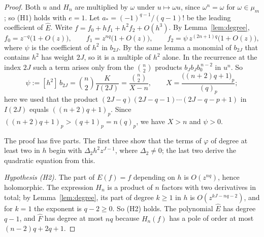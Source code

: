 \documentclass[11pt]{article}
\theoremstyle{definition}
\theoremstyle{remark}
\numberwithin{equation}{section}
\newcommand{\hatt}[1]{\widehat{#1}}
\begin{document}
\begin{proof}
Both \(u\) and \(H_n\) are multiplied by \(\omega\) under
\(u\mapsto\omega u\), since \(\omega^n=\omega\) for \(\omega\in\mu_m\);
so (H1) holds with \(e=1\). Let \(a_*=(-1)^{q-1}/(q-1)!\) be the
leading coefficient of \(\hatt E\). Write
\(f=f_0+hf_1+h^2f_2+O(h^3)\). By Lemma~\ref{lem:degree},
\[
 f_0=z^{-q}\bigl(1+O(z)\bigr),\qquad
 f_1=z^{nq}\bigl(1+O(z)\bigr),\qquad
 f_2=\psi\,z^{(2n+1)q}\bigl(1+O(z)\bigr),
\]
where \(\psi\) is the coefficient of \(h^2\) in \(b_{2J}\). By the
same lemma a monomial of \(b_{2J}\) that contains \(h^2\) has weight
\(2J\), so it is a multiple of \(h^2\) alone. In the recurrence at the
index \(2J\) such a term arises only from the \(\binom n2\) products
\(b_Jb_Jb_0^{\,n-2}\) in \(u^n\). So
\begin{equation}\label{eq:psi}
 \psi:=[h^2]\,b_{2J}=\binom n2\frac{K}{I(2J)}=\frac{\binom n2}{X-n},
 \qquad X=\frac{\bigl((n+2)q+1\bigr)_p}{(q)_p};
\end{equation}
here we used that the product \((2J-q)(2J-q-1)\cdots(2J-q-p+1)\) in
\(I(2J)\) equals \(((n+2)q+1)_p\). Since
\(((n+2)q+1)_p>(q+1)_p=n(q)_p\), we have \(X>n\) and \(\psi>0\).

The proof has five parts. The first three show that the terms of
\(\varphi\) of degree at least two in \(h\) begin with
\(\Delta_2h^2z^{J-1}\), where \(\Delta_2\ne0\); the last two derive the
quadratic equation from this.

\emph{Hypothesis \textup{(H2)}.} The part of \(E(f)=f\)
depending on \(h\) is \(O(z^{nq})\), hence holomorphic. The expression
\(H_n\) is a product of \(n\) factors with two derivatives in total; by
Lemma~\ref{lem:degree}, its part of degree \(k\ge1\) in \(h\) is
\(O(z^{kJ-nq-2})\), and for \(k=1\) the exponent is \(q-2\ge0\). So
(H2) holds. The polynomial \(\hatt E\) has degree \(q-1\), and
\(\hatt F\) has degree at most \(nq\) because \(H_n(f)\) has a pole of
order at most \((n-2)q+2q+1\).


\end{proof}
\end{document}
